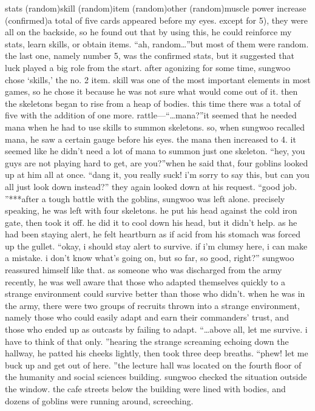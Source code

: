 stats (random)skill (random)item (random)other (random)muscle power increase (confirmed)a total of five cards appeared before my eyes.
 except for 5), they were all on the backside, so he found out that by using this, he could reinforce my stats, learn skills, or obtain items.
“ah, random…”but most of them were random.
 the last one, namely number 5, was the confirmed stats, but it suggested that luck played a big role from the start.
after agonizing for some time, sungwoo chose ‘skills,’ the no.
 2 item.
 skill was one of the most important elements in most games, so he chose it because he was not sure what would come out of it.
then the skeletons began to rise from a heap of bodies.
 this time there was a total of five with the addition of one more.
rattle—“…mana?”it seemed that he needed mana when he had to use skills to summon skeletons.
 so, when sungwoo recalled mana, he saw a certain gauge before his eyes.
the mana then increased to 4.
 it seemed like he didn’t need a lot of mana to summon just one skeleton.
“hey, you guys are not playing hard to get, are you?”when he said that, four goblins looked up at him all at once.
“dang it, you really suck! i’m sorry to say this, but can you all just look down instead?”
they again looked down at his request.
“good job.
”***after a tough battle with the goblins, sungwoo was left alone.
 precisely speaking, he was left with four skeletons.
he put his head against the cold iron gate, then took it off.
 he did it to cool down his head, but it didn’t help.
 as he had been staying alert, he felt heartburn as if acid from his stomach was forced up the gullet.
“okay, i should stay alert to survive.
 if i’m clumsy here, i can make a mistake.
 i don’t know what’s going on, but so far, so good, right?” sungwoo reassured himself like that.
as someone who was discharged from the army recently, he was well aware that those who adapted themselves quickly to a strange environment could survive better than those who didn’t.
when he was in the army, there were two groups of recruits thrown into a strange environment, namely those who could easily adapt and earn their commanders’ trust, and those who ended up as outcasts by failing to adapt.
“…above all, let me survive.
 i have to think of that only.
”hearing the strange screaming echoing down the hallway, he patted his cheeks lightly, then took three deep breaths.
“phew! let me buck up and get out of here.
”the lecture hall was located on the fourth floor of the humanity and social sciences building.
 sungwoo checked the situation outside the window.
the cafe streets below the building were lined with bodies, and dozens of goblins were running around, screeching.
